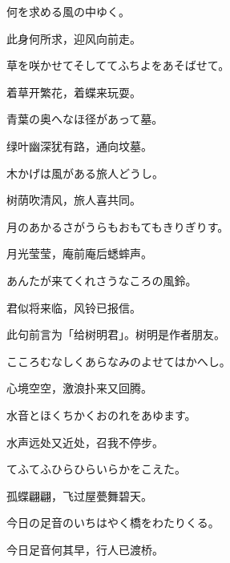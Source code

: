 \begin{haiku}
    {\FH 何を求める風の中ゆく。}

    {\FK 此身何所求，迎风向前走。}
\end{haiku}

\begin{haiku}
    {\FH 草を咲かせてそしててふちよをあそばせて。}

    {\FK 着草开繁花，着蝶来玩耍。}
\end{haiku}

\begin{haiku}
    {\FH 青葉の奥へなほ径があって墓。}

    {\FK 绿叶幽深犹有路，通向坟墓。}
\end{haiku}

\begin{haiku}
    {\FH 木かげは風がある旅人どうし。}

    {\FK 树荫吹清风，旅人喜共同。}
\end{haiku}

\begin{haiku}
    {\FH 月のあかるさがうらもおもてもきりぎりす。}

    {\FK 月光莹莹，庵前庵后蟋蟀声。}
\end{haiku}

\begin{haiku}
    {\FH あんたが来てくれさうなころの風鈴。}

    {\FK 君似将来临，风铃已报信。}

    {\FS 此句前言为「给树明君」。树明是作者朋友。}
\end{haiku}

\begin{haiku}
    {\FH こころむなしくあらなみのよせてはかへし。}

    {\FK 心境空空，激浪扑来又回腾。}
\end{haiku}

\begin{haiku}
    {\FH 水音とほくちかくおのれをあゆます。}

    {\FK 水声远处又近处，召我不停步。}
\end{haiku}

\begin{haiku}
    {\FH てふてふひらひらいらかをこえた。}

    {\FK 孤蝶翩翩，飞过屋甍舞碧天。}
\end{haiku}

\begin{haiku}
    {\FH 今日の足音のいちはやく橋をわたりくる。}

    {\FK 今日足音何其早，行人已渡桥。}
\end{haiku}

